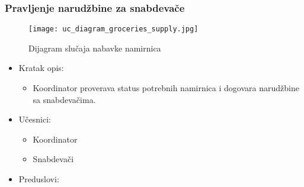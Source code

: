 

\subsubsection{Pravljenje narudžbine za snabdevače}
\begin{figure}[H]
\begin{center}
\texttt{[image: uc\_diagram\_groceries\_supply.jpg]}

    \caption{Dijagram slučaja nabavke namirnica}
    \end{center}
\label{fig:Uc_diagram_groceries_supply}
\end{figure}

\begin{itemize}
	\item Kratak opis:
		\begin{itemize}
			\item Koordinator proverava status potrebnih namirnica i dogovara narudžbine sa snabdevačima.
		\end{itemize}
	\item Učesnici:
		\begin{itemize}
		    \item Koordinator
		    \item Snabdevači
		\end{itemize}
	\item Preduslovi:
		\begin{itemize}
		   

\end{itemize}
\end{itemize}
